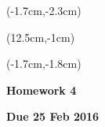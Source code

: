 \documentclass[12pt, oneside]{article}
\begin{document}


\begin{textblock*}{4cm}(-1.7cm,-2.3cm)
\end{textblock*}

\begin{textblock*}{8cm}(12.5cm,-1cm)
\end{textblock*}
\begin{textblock*}{13.5cm}(-1.7cm,-1.8cm)
\end{textblock*}

\vspace{1cm}

\begin{center}
\textbf{\Large Homework 4}

\textbf{Due 25 Feb 2016}
\end{center}
\end{document}
